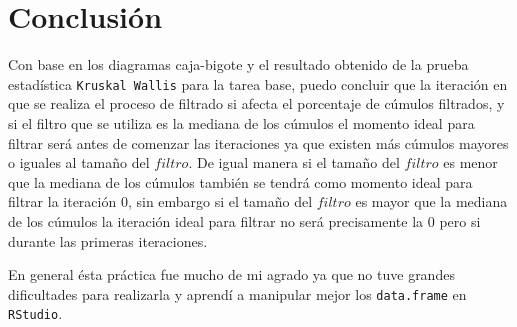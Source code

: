 \documentclass{article}
\begin{document}
\newpage
\section{Conclusi\'{o}n}
Con base en los diagramas caja-bigote y el resultado obtenido de la prueba estadística \texttt{Kruskal Wallis} para la tarea base, puedo concluir que la iteración en que se realiza el proceso de filtrado si afecta el porcentaje de cúmulos filtrados, y si el filtro que se utiliza es la mediana de los cúmulos el momento ideal para filtrar será antes de comenzar las iteraciones ya que existen más cúmulos mayores o iguales al tamaño del $filtro$. De igual manera si el tamaño del $filtro$ es menor que la mediana de los cúmulos también se tendrá como momento ideal para filtrar la iteración $0$, sin embargo si el tamaño del $filtro$ es mayor que la mediana de los cúmulos la iteración ideal para filtrar no será precisamente la $0$ pero si durante las primeras iteraciones.
\smallskip

En general ésta práctica fue mucho de mi agrado ya que no tuve grandes dificultades para realizarla y aprendí a manipular mejor los \texttt{data.frame} en \texttt{RStudio}.
\newpage



\end{document}
